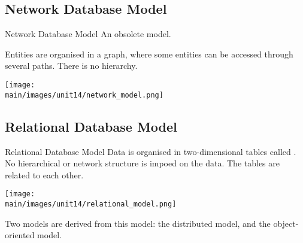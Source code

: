 \documentclass[\main/notes.tex]{subfiles}
\begin{document}
			\subsection{Network Database Model}
				\begin{definition}{Network Database Model}
					An obsolete model.

					Entities are organised in a graph, where some entities can be accessed through several paths. There is no hierarchy.

					\begin{center}
						\texttt{[image: \\main/images/unit14/network\_model.png]}
					\end{center}
				\end{definition}
			\pagebreak
			\subsection{Relational Database Model}
				\begin{definition}{Relational Database Model}
					Data is organised in two-dimensional tables called . No hierarchical or network structure is impoed on the data. The tables are related to each other.

					\begin{center}
						\texttt{[image: \\main/images/unit14/relational\_model.png]}
					\end{center}

					Two models are derived from this model: the distributed model, and the object-oriented model.
				\end{definition}
\end{document}
